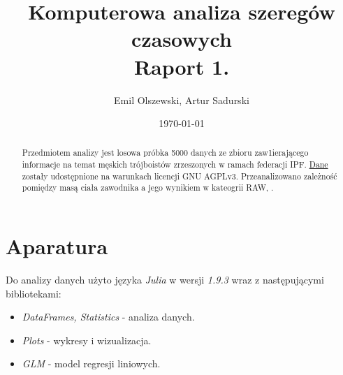 \documentclass{article}
\author{Emil Olszewski, Artur Sadurski}
\date{\today}
\title{Komputerowa analiza szeregów czasowych \\ Raport 1.}
\begin{document}
\maketitle

\begin{abstract}
Przedmiotem analizy jest losowa próbka 5000 danych ze zbioru zaw1ierającego informacje na temat 
męskich trójboistów zrzeszonych w ramach federacji IPF. \href{https://gitlab.com/openpowerlifting/opl-data}{Dane} zostały udostępnione na warunkach licencji GNU AGPLv3. 
Przeanalizowano zależność pomiędzy masą ciała zawodnika a jego wynikiem w kateogrii RAW, . 
\end{abstract}

\section{Aparatura}
Do analizy danych użyto języka \textit{Julia} w wersji \textit{1.9.3} wraz z następującymi bibliotekami:
\begin{itemize}
\item \textit{DataFrames, Statistics} - analiza danych.
\item \textit{Plots} - wykresy i wizualizacja. 
\item \textit{GLM} - model regresji liniowych. 
\end{itemize}
\end{document}
